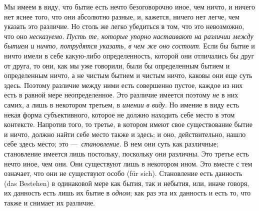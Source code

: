 Мы имеем в виду, что бытие есть нечто безоговорочно иное, чем ничто, и
ничего нет яснее того, что они абсолютно разные, и, кажется, ничего нет
легче, чем указать это различие. Но столь же легко убедиться в том, что это
невозможно, что оно {\em несказуемо}.
{\em Пусть те, которые упорно}
{\em настаивают на различии между бытием и ничто,
потрудятся указать, в чем же оно состоит}. Если бы бытие и ничто имели в
себе какую-либо определенность, которой они отличались бы друг от друга, то
они, как мы уже говорили, были бы определенным бытием и определенным ничто,
а не чистым бытием и чистым ничто, каковы они еще суть здесь. Поэтому
различие между ними есть совершенно пустое, каждое из них есть в равной
мере неопределенное. Это различие имеется поэтому
{\em не} в них самих, а лишь в некотором третьем, в
{\em имении в виду}. Но имение в виду есть некая форма
субъективного, которое не должно находить себе место в этом контексте.
Напротив того, то третье, в котором имеют свое существование бытие и ничто,
должно найти себе место также и здесь; и оно, действительно, нашло себе
здесь место; это ---~{\em становление}. В нем они суть
как различные; становление имеется лишь постольку, поскольку они различны.
Это третье есть нечто иное, чем они. Они существуют лишь в некотором
ином. Это вместе с тем означает, что они не существуют особо (für sich).
Становление есть данность (das Bestehen) в одинаковой мере как бытия, так и
небытия, или, иначе говоря, их данность есть лишь их бытие в
{\em одном}; как раз эта их данность и есть то, что
также и снимает их различие.

